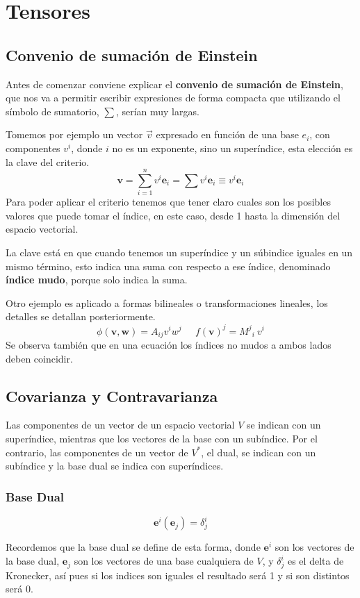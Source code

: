 \section{Tensores}
\subsection{Convenio de sumación de Einstein}
Antes de comenzar conviene explicar el \textbf{convenio de sumación de Einstein}, que nos va a permitir escribir expresiones de forma compacta que utilizando el símbolo de sumatorio, $\sum$, serían muy largas.

Tomemos por ejemplo un vector $\vec{v}$ expresado en función de una base $e_i$, con componentes $v^i$, donde $i$ no es un exponente, sino un superíndice, esta elección es la clave del criterio.
\[\bm{v}=\sum_{i=1}^n{v^i \bm{e}_i}=\sum{v^i \bm{e}_i}\equiv v^i \bm{e}_i\]
Para poder aplicar el criterio tenemos que tener claro cuales son los posibles valores que puede tomar el índice, en este caso, desde 1 hasta la dimensión del espacio vectorial.

La clave está en que cuando tenemos un superíndice y un súbindice iguales en un mismo término, esto indica una suma con respecto a ese índice, denominado \textbf{índice mudo}, porque solo indica la suma.

Otro ejemplo es aplicado a formas bilineales o transformaciones lineales, los detalles se detallan posteriormente.
\[\phi(\bm{v},\bm{w})=A_{ij} v^i w^j \;\;\;\;\; {f(\bm{v})}^j={M^j}_i \ v^i\]
Se observa también que en una ecuación los índices no mudos a ambos lados deben coincidir.
\subsection{Covarianza y Contravarianza}
Las componentes de un vector de un espacio vectorial $V$ se indican con un superíndice, mientras que los vectores de la base con un subíndice. Por el contrario, las componentes de un vector de $V^*$, el dual, se indican con un subíndice y la base dual se indica con superíndices.
\subsubsection{Base Dual}
\vspace{-25pt}
\begin{Large}\begin{equation}
\bm{e}^i (\bm{e}_j)= \delta^i_j
\end{equation}\end{Large}
Recordemos que la base dual se define de esta forma, donde $\bm{e}^i$ son los vectores de la base dual, $\bm{e}_j$ son los vectores de una base cualquiera de $V$, y $\delta^i_j$ es el delta de Kronecker, así pues si los indices son iguales el resultado será 1 y si son distintos será 0.
